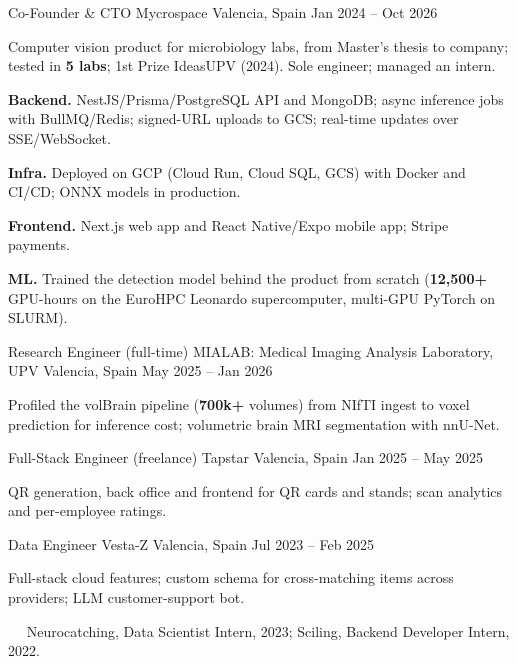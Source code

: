 \begin{cventries}
\cvkeep
\cventry
    {Co-Founder \& CTO}
    {Mycrospace}
    {Valencia, Spain}
    {Jan 2024 – Oct 2026}
    {
\begin{cvitems}
\item {Computer vision product for microbiology labs, from Master's thesis to company; tested in \textbf{5 labs}; 1st Prize IdeasUPV (2024). Sole engineer; managed an intern.}
\item {\textbf{Backend.} NestJS/Prisma/PostgreSQL API and MongoDB; async inference jobs with BullMQ/Redis; signed-URL uploads to GCS; real-time updates over SSE/WebSocket.}
\item {\textbf{Infra.} Deployed on GCP (Cloud Run, Cloud SQL, GCS) with Docker and CI/CD; ONNX models in production.}
\item {\textbf{Frontend.} Next.js web app and React Native/Expo mobile app; Stripe payments.}
\item {\textbf{ML.} Trained the detection model behind the product from scratch (\textbf{12,500+} GPU-hours on the EuroHPC Leonardo supercomputer, multi-GPU PyTorch on SLURM).}
\end{cvitems}
    }
\cvkeep
\cventry
    {Research Engineer (full-time)}
    {MIALAB: Medical Imaging Analysis Laboratory, UPV}
    {Valencia, Spain}
    {May 2025 – Jan 2026}
    {
\begin{cvitems}
\item {Profiled the volBrain pipeline (\textbf{700k+} volumes) from NIfTI ingest to voxel prediction for inference cost; volumetric brain MRI segmentation with nnU-Net.}
\end{cvitems}
    }
\cvkeep
\cventry
    {Full-Stack Engineer (freelance)}
    {Tapstar}
    {Valencia, Spain}
    {Jan 2025 – May 2025}
    {
\begin{cvitems}
\item {QR generation, back office and frontend for QR cards and stands; scan analytics and per-employee ratings.}
\end{cvitems}
    }
\cvkeep
\cventry
    {Data Engineer}
    {Vesta-Z}
    {Valencia, Spain}
    {Jul 2023 – Feb 2025}
    {
\begin{cvitems}
\item {Full-stack cloud features; custom schema for cross-matching items across providers; LLM customer-support bot.}
\end{cvitems}
    }
\end{cventries}
\vspace{0.4mm}
~~{\fontsize{8pt}{1em}\bodyfontlight\color{text} Neurocatching, Data Scientist Intern, 2023; Sciling, Backend Developer Intern, 2022.}\par

